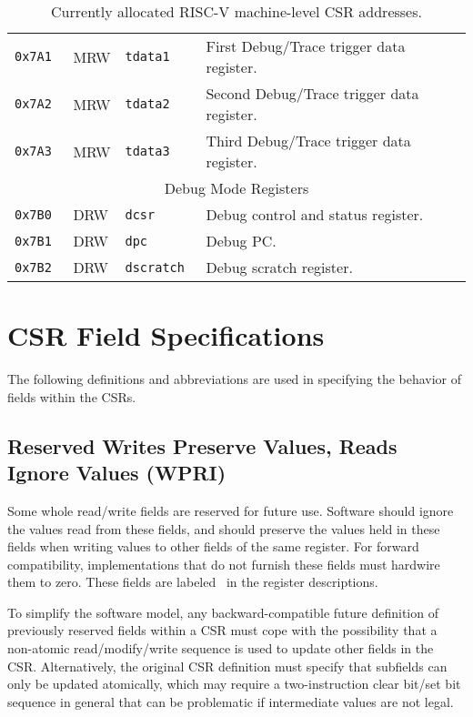 \begin{table}[htb!]
\begin{center}
\begin{tabular}{|l|l|l|l|}
\tt 0x7A1 & MRW &\tt tdata1 & First Debug/Trace trigger data register. \\
\tt 0x7A2 & MRW &\tt tdata2 & Second Debug/Trace trigger data register. \\
\tt 0x7A3 & MRW &\tt tdata3 & Third Debug/Trace trigger data register. \\
\hline
\multicolumn{4}{|c|}{Debug Mode Registers } \\
\hline
\tt 0x7B0 & DRW &\tt dcsr & Debug control and status register. \\
\tt 0x7B1 & DRW &\tt dpc & Debug PC. \\
\tt 0x7B2 & DRW &\tt dscratch & Debug scratch register. \\
\hline
\end{tabular}
\end{center}
\caption{Currently allocated RISC-V machine-level CSR addresses.}
\label{mcsrnames1}
\end{table}

\clearpage

\section{CSR Field Specifications}


The following definitions and abbreviations are used in specifying the
behavior of fields within the CSRs.

\subsection*{Reserved Writes Preserve Values, Reads Ignore Values (WPRI)}

Some whole read/write fields are reserved for future use.  Software
should ignore the values read from these fields, and should preserve
the values held in these fields when writing values to other fields of
the same register.
For forward compatibility, implementations that do not furnish these fields
must hardwire them to zero.
These fields are labeled \wpri\ in the register descriptions.

\begin{commentary}
To simplify the software model, any backward-compatible future
definition of previously reserved fields within a CSR must cope with
the possibility that a non-atomic read/modify/write sequence is used
to update other fields in the CSR.  Alternatively, the original CSR
definition must specify that subfields can only be updated atomically,
which may require a two-instruction clear bit/set bit sequence in
general that can be problematic if intermediate values are not legal.
\end{commentary}

